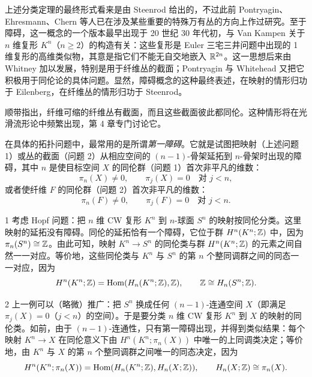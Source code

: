 上述分类定理的最终形式看来是由 Steenrod 给出的，不过此前 Pontryagin、Ehresmann、Chern 等人已在涉及某些重要的特殊万有丛的方向上作过研究。至于障碍，这一概念的一个版本最早出现于 20 世纪 30 年代初，与 Van Kampen 关于 $n$ 维复形 $K^n$（$n\ge 2$）的构造有关：这些复形是 Euler 三宅三井问题中出现的 1 维复形的高维类似物，其意是指它们不能无自交地嵌入 $\mathbb{R}^{2n}$。这一思想后来由 Whitney 加以发展，特别是用于纤维丛的截面；Pontryagin 与 Whitehead 又把它积极用于同伦论的具体问题。显然，障碍概念的这种最终表述，在映射的情形归功于 Eilenberg，在纤维丛的情形归功于 Steenrod。

顺带指出，纤维可缩的纤维丛有截面，而且这些截面彼此都同伦。这种情形将在光滑流形论中频繁出现，第 4 章专门讨论它。

在具体的拓扑问题中，最常用的是所谓\emph{第一障碍}。它就是试图把映射（上述问题 1）或丛的截面（问题 2）从相应空间的 $(n-1)$-骨架延拓到 $n$-骨架时出现的障碍，其中 $n$ 是使目标空间 $X$ 的同伦群（问题 1）首次非平凡的维数：
\[
\pi_n(X)\ne 0,\qquad \pi_j(X)=0\quad\text{对 } j<n,
\]
或者使纤维 $F$ 的同伦群（问题 2）首次非平凡的维数：
\[
\pi_n(F)\ne 0,\qquad \pi_j(F)=0\quad\text{对 } j<n.
\]

\begin{example}{1}
考虑 Hopf 问题：把 $n$ 维 CW 复形 $K^n$ 到 $n$-球面 $S^n$ 的映射按同伦分类。这里映射的延拓没有障碍。同伦的延拓恰有一个障碍，它位于群 $H^n(K^n;\mathbb{Z})$ 中，因为 $\pi_n(S^n)\cong\mathbb{Z}$。由此可知，映射 $K^n\to S^n$ 的同伦类与群 $H^n(K^n;\mathbb{Z})$ 的元素之间自然一一对应。等价地，这些同伦类与 $K^n$ 与 $S^n$ 的第 $n$ 个整同调群之间的同态一一对应，因为
\[
H^n(K^n;\mathbb{Z})=\operatorname{Hom}(H_n(K^n;\mathbb{Z}),\mathbb{Z}),\qquad \mathbb{Z}\cong H_n(S^n;\mathbb{Z}).
\]
\end{example}

\begin{example}{2}
上一例可以（略微）推广：把 $S^n$ 换成任何 $(n-1)$-连通空间 $X$（即满足 $\pi_j(X)=0$（$j<n$）的空间）。于是要分类 $n$ 维 CW 复形 $K^n$ 到 $X$ 的映射的同伦类。如前，由于 $(n-1)$-连通性，只有第一障碍出现，并得到类似结果：每个映射 $K^n\to X$ 在同伦意义下由 $H^n(K^n;\pi_n(X))$ 中唯一的上同调类决定；等价地，由 $K^n$ 与 $X$ 的第 $n$ 个整同调群之间唯一的同态决定，因为
\[
H^n(K^n;\pi_n(X))=\operatorname{Hom}(H_n(K^n;\mathbb{Z}),H_n(X;\mathbb{Z})),\qquad H_n(X;\mathbb{Z})\cong\pi_n(X).
\]
\end{example}

